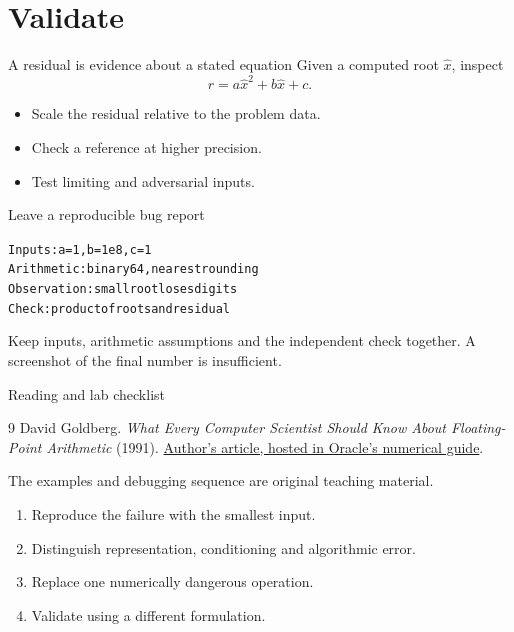 \documentclass[14pt,aspectratio=1610]{beamer}
\begin{document}
\section{Validate}
\begin{frame}{A residual is evidence about a stated equation}
Given a computed root $\widehat x$, inspect
\[
 r=a\widehat x^2+b\widehat x+c.
\]
\begin{itemize}
\item Scale the residual relative to the problem data.
\item Check a reference at higher precision.
\item Test limiting and adversarial inputs.
\end{itemize}
\end{frame}
\begin{frame}[fragile]{Leave a reproducible bug report}
\begin{alltt}
Inputs:      a = 1, b = 1e8, c = 1
Arithmetic:  binary64, nearest rounding
Observation: small root loses digits
Check:       product of roots and residual
\end{alltt}
\small Keep inputs, arithmetic assumptions and the independent check together. A screenshot of the final number is insufficient.
\end{frame}
\appendix
\begin{frame}[allowframebreaks]{Reading and lab checklist}
\small
\begin{thebibliography}{9}
 David Goldberg. \emph{What Every Computer Scientist Should Know About Floating-Point Arithmetic} (1991).
\href{https://docs.oracle.com/cd/E19957-01/806-3568/ncg_goldberg.html}{Author's article, hosted in Oracle's numerical guide}.
\end{thebibliography}
The examples and debugging sequence are original teaching material.
\framebreak
\begin{enumerate}
\item Reproduce the failure with the smallest input.
\item Distinguish representation, conditioning and algorithmic error.
\item Replace one numerically dangerous operation.
\item Validate using a different formulation.
\end{enumerate}
\end{frame}
\end{document}
